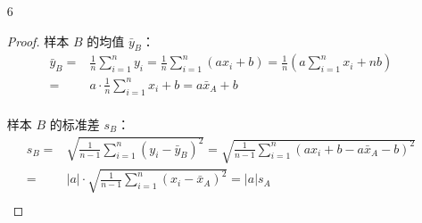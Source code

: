 \documentclass[normal,founder,mtpro2,cn]{elegantnote}
\begin{document}
\begin{enumerate}
\begin{proof}
            （另一种思路）
            \begin{equation*}
                \begin{aligned}
                    s_{n+1}^{2}=&\frac{1}{n}\sum_{i=1}^{n+1}\left(x_{i}-\bar{x}_{n+1}\right)^{2}=\frac{1}{n}\sum_{i=1}^{n+1}\left[(x_{i}-\bar{x}_n)+(\bar{x}_n-\bar{x}_{n+1})\right]^{2} \\
                    =&\frac{1}{n}\left[\sum_{i=1}^{n+1}\left(x_{i}-\bar{x}_{n}\right)^{2}\right]+\frac{2}{n}\left(\bar{x}_{n}-\bar{x}_{n+1}\right)\sum_{i=1}^{n+1}\left(x_{i}-\bar{x}_{n}\right)+\frac{1}{n}\sum_{i=1}^{n+1}\left(\bar{x}_{n}-\bar{x}_{n+1}\right)^{2} \\
                    =&\frac{1}{n}\left[\sum_{i=1}^{n+1}\left(x_{i}-\bar{x}_{n}\right)^{2}\right]-\frac{n+1}{n}\left(\bar{x}_{n}-\bar{x}_{n+1}\right)^{2} \\
                    =&\frac{1}{n}\left[\sum_{i=1}^{n}\left(x_{i}-\bar{x}_{n}\right)^{2}+\left(x_{n+1}-\bar{x}_{n}\right)^{2}\right]-\frac{n+1}{n}\frac{1}{(n+1)^{2}}\left(x_{n+1}-\bar{x}_{n}\right)^{2} \\
                    =&\frac{1}{n}\left[(n-1) \frac{1}{n-1} \sum_{i=1}^{n}\left(x_{i}-\bar{x}_{n}\right)^{2}+\frac{n}{n+1}\left(x_{n+1}-\bar{x}_{n}\right)^{2}\right] \\
                    =&\frac{n-1}{n} s_{n}^{2}+\frac{1}{n+1}\left(x_{n+1}-\bar{x}_{n}\right)^{2}
                \end{aligned}
            \end{equation*}
        \end{proof}

        \item[6] 
        \begin{proof}
            样本 $B$ 的均值 $\bar{y}_{B}$：
            \begin{equation*}
                \begin{aligned}
                    \bar{y}_{B}=&\frac{1}{n}\sum_{i=1}^{n}y_{i}=\frac{1}{n}\sum_{i=1}^{n}\left(ax_{i}+b\right)=\frac{1}{n}\left(a\sum_{i=1}^{n}x_{i}+nb\right) \\
                    =&a\cdot\frac{1}{n}\sum_{i=1}^{n}x_{i}+b=a\bar{x}_{A}+b \\
                \end{aligned}
            \end{equation*}
    
            样本 $B$ 的标准差 $s_{B}$：
            \begin{equation*}
                \begin{aligned}
                    s_{B}=&\sqrt{\frac{1}{n-1} \sum_{i=1}^{n}\left(y_{i}-\bar{y}_{B}\right)^{2}}=\sqrt{\frac{1}{n-1} \sum_{i=1}^{n}\left(a x_{i}+b-a \bar{x}_{A}-b\right)^{2}} \\
                    =&|a| \cdot \sqrt{\frac{1}{n-1} \sum_{i=1}^{n}\left(x_{i}-\bar{x}_{A}\right)^{2}}=|a| s_{A}\\
                \end{aligned}
            \end{equation*}
    

\end{proof}
\end{enumerate}
\end{document}
